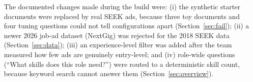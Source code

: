 The documented changes made during the build were:
(i) the synthetic starter documents were replaced by real SEEK ads, because three toy documents and four tuning questions could not tell configurations apart (Section~\ref{sec:fail});
(ii) a newer 2026 job-ad dataset (NextGig) was rejected for the 2018 SEEK data (Section~\ref{sec:data});
(iii) an experience-level filter was added after the team measured how few ads are genuinely entry-level; and
(iv) role-wide questions (``What skills does this role need?'') were routed to a deterministic skill count, because keyword search cannot answer them (Section~\ref{sec:overview}).
